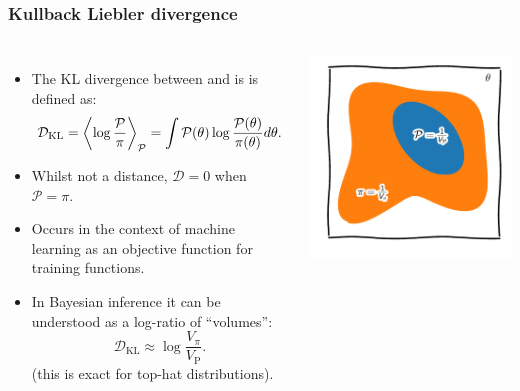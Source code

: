 \documentclass[aspectratio=169]{beamer}
\begin{document}
\begin{frame}
    \frametitle{Kullback Liebler divergence}
    \begin{columns}
        \begin{itemize}
            \item The KL divergence between  and  is is defined as:
                \[\mathcal{D}_\text{KL} = \av[\mathcal{P}]{\log\frac{\mathcal{P}}{\pi}} = \int \mathcal{P}(\theta) \log \frac{\mathcal{P}(\theta)}{\pi(\theta)}d\theta.\]
            \item Whilst not a distance, $\mathcal{D}=0$ when $\mathcal{P}=\pi$.
            \item Occurs in the context of machine learning as an objective function for training functions.
            \item In Bayesian inference it can be understood as a log-ratio of ``volumes'':
                \[ \mathcal{D}_\text{KL} \approx \log \frac{V_\pi}{V_\text{P}}.\]
                (this is exact for top-hat distributions).
        \end{itemize}
        \includegraphics{figures/volumes.pdf}
    \end{columns}
\end{frame}
\end{document}
